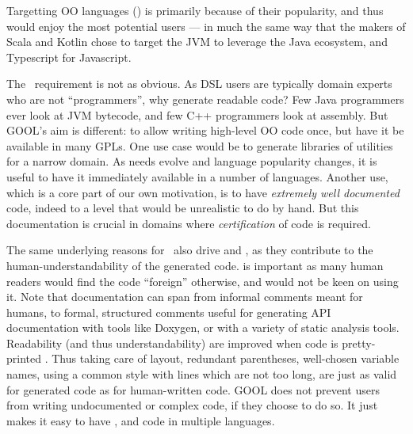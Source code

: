 \documentclass[sigplan,review,anonymous,prologue,dvipsnames]{acmart}
\begin{document}
Targetting OO languages (\mainstream) is primarily because of their popularity, and thus
would enjoy the most potential users --- in much the same way that the makers
of Scala and Kotlin chose to target the JVM to leverage the Java ecosystem, and
Typescript for Javascript.

The \readable~requirement is not as obvious. As DSL users are typically
domain experts who are not ``programmers'', why generate readable code?
Few Java programmers ever look at JVM bytecode, and few C++ programmers
look at assembly. But GOOL's aim is different: to allow writing
high-level OO code once, but have it be available in many GPLs. One use case
would be to generate libraries of utilities for a narrow domain. As needs
evolve and language popularity changes, it is useful to have it immediately
available in a number of languages. Another use, which is a core part of our
own motivation, is to have \emph{extremely well documented} code, indeed to
a level that would be unrealistic to do by hand. But this documentation is
crucial in domains where \emph{certification} of code is required.

The same underlying reasons for \readable~also drive \idiomatic and \documented,
as they contribute to the human-understandability of the generated code.
\idiomatic is important as many human readers would find the code ``foreign''
otherwise, and would not be keen on using it.
Note that documentation can span from informal comments meant for humans, to
formal, structured comments useful for generating API documentation with tools
like Doxygen, or with a variety of static analysis tools.
Readability (and thus understandability) are improved when code is pretty-printed%
\cite{buse2009learning}. Thus taking care of layout, redundant parentheses,
well-chosen variable names, using a common style with lines which are not too
long, are just as valid for generated code as for human-written code.
GOOL does not prevent users from writing undocumented or complex code, if they
choose to do so. It just makes it easy to have \readable, \idiomatic and
\documented code in multiple languages.
\end{document}
